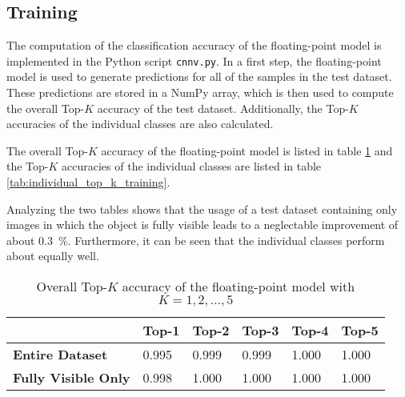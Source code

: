 \subsection{Training}
\label{subsec:verification_and_benchmark:classification_performance:training}

The computation of the classification accuracy of the floating-point model is implemented in the Python script \texttt{cnnv.py}.
In a first step, the floating-point model is used to generate predictions for all of the samples in the test dataset.
These predictions are stored in a NumPy array, which is then used to compute the overall Top-$K$ accuracy of the test dataset.
Additionally, the Top-$K$ accuracies of the individual classes are also calculated.

The overall Top-$K$ accuracy of the floating-point model is listed in table \ref{tab:overall_top_k_training} and the Top-$K$ accuracies of the individual classes are listed in table \ref{tab:individual_top_k_training}.

Analyzing the two tables shows that the usage of a test dataset containing only images in which the object is fully visible leads to a neglectable improvement of about \SI{0.3}{\percent}.
Furthermore, it can be seen that the individual classes perform about equally well.

\begin{table}[b]
  \caption{Overall Top-$K$ accuracy of the floating-point model with $K = 1, 2, \dots, 5$}
  \label{tab:overall_top_k_training}
  \centering
  \begin{tabular}{llllll}
    \toprule
     & \textbf{Top-1} & \textbf{Top-2} & \textbf{Top-3} & \textbf{Top-4} & \textbf{Top-5} \\
    \midrule
    \textbf{Entire Dataset} & \num{0.995} & \num{0.999} & \num{0.999} & \num{1.000} & \num{1.000} \\
    \textbf{Fully Visible Only} & \num{0.998} & \num{1.000} & \num{1.000} & \num{1.000} & \num{1.000} \\ %
    \bottomrule
  \end{tabular}
\end{table}

